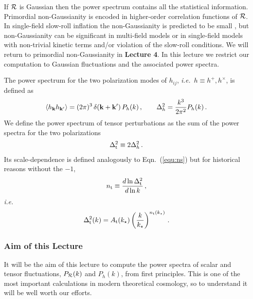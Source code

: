 \documentclass[12pt,letterpaper,rotate]{article}
\def\beq{\begin{equation}}
\def\eeq{\end{equation}}
\def\R{{\cal R}}
\begin{document}
{If $\R$ is Gaussian then the power spectrum contains all the
statistical information. Primordial non-Gaussianity is encoded in higher-order correlation functions of $\R$.
In single-field slow-roll inflation the non-Gaussianity is predicted to be small
\cite{Acquaviva02,malda}, 
but non-Gaussianity can be significant in multi-field models or in single-field models with non-trivial kinetic terms and/or violation of the slow-roll conditions.
 We will return to primordial non-Gaussianity in {\bf Lecture 4}. In this lecture we restrict our computation to Gaussian fluctuations and the associated power spectra.


The power spectrum for the two
polarization modes of $h_{ij}$, {\it i.e.}~$h \equiv h^+, h^\times$, is defined as \beq \langle h_{\bf k} h_{{\bf k}'} \rangle = (2\pi)^3\, \delta({\bf
k} + {\bf k}')\, P_h(k)\, , \qquad \Delta_h^2 = \frac{k^3}{2\pi^2} P_h(k)\, .  %
\eeq
We define the power spectrum of tensor perturbations as the sum of the power spectra for the two polarizations
\beq
\Delta_{\rm t}^2 \equiv 2 \Delta_h^2\, .
\eeq
 Its scale-dependence is defined analogously to Eqn.~(\ref{equ:ns}) but for historical reasons without the $-1$,
\beq n_{\rm t} \equiv \frac{d \ln \Delta^2_{\rm t}}{d \ln k}\, , \eeq
{\it i.e.}
\beq
\Delta^2_{\rm t}(k) = A_{\rm t}(k_\star) \left(\frac{k}{k_\star}\right)^{n_{\rm t}(k_\star)}\, .
\eeq


\vspace{0.5cm}
\subsubsection*{Aim of this Lecture}
It will be the aim of this lecture to compute the power spectra of scalar and tensor fluctuations, $P_\R(k)$ and $P_h(k)$, from first principles.
This is one of the most important calculations in modern theoretical cosmology, so to understand it will be well worth our efforts.


}
\end{document}
